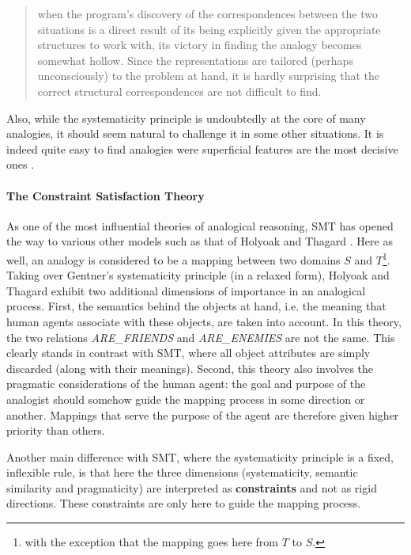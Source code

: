 \begin{quote}
  when the program’s discovery of the correspondences between the two situations
  is a direct result of its being explicitly given the appropriate structures
  to work with, its victory in finding the analogy becomes somewhat hollow.
  Since the representations are tailored (perhaps unconsciously) to the problem
  at hand, it is hardly surprising that the correct structural correspondences
  are not difficult to find.
\end{quote}

Also, while the systematicity principle is undoubtedly at the core of many
analogies, it should seem natural to challenge it in some other situations. It
is indeed quite easy to find analogies were superficial features are the most
decisive ones \cite{Bar10}.

\paragraph{The Constraint Satisfaction Theory\\}

As one of the most influential theories of analogical reasoning, SMT has opened
the way to various other models such as that of Holyoak and Thagard
\cite{HolTha89}. Here as well, an analogy is considered to be a mapping between
two domains $S$ and $T$\footnote{with the exception that the mapping goes here
from $T$ to $S$.}. Taking over Gentner's systematicity principle (in a relaxed
form), Holyoak and Thagard exhibit two additional dimensions of importance in
an analogical process. First, the semantics behind the objects at hand, i.e.
the meaning that human agents associate with these objects, are taken into
account. In this theory, the two relations \textit{ARE\_FRIENDS} and
\textit{ARE\_ENEMIES} are not the same. This clearly stands in contrast with
SMT, where all object attributes are simply discarded (along with their
meanings). Second, this theory also involves
the pragmatic considerations of the human agent: the goal and purpose of the
analogist should somehow guide the mapping process in some direction or
another. Mappings that serve the purpose of the agent are therefore given
higher priority than others.

Another main difference with SMT, where the systematicity principle is a fixed,
inflexible rule, is that here the three dimensions (systematicity, semantic
similarity and pragmaticity) are interpreted as \textbf{constraints} and not as
rigid directions. These constraints are only here to guide the mapping process.

